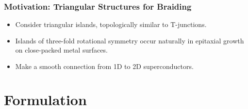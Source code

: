 \documentclass[xcolor=dvipsnames,10pt,aspectratio=169]{beamer}
\newcommand{\MO}{Motivation}
\newcommand{\FO}{Formulation}
\begin{document}
  \begin{frame}
    \frametitle{\MO: Triangular Structures for Braiding}
    \begin{multicols}{2}

    \begin{itemize}
      \item Consider triangular islands, topologically similar to T-junctions.
      \item Islands of three-fold rotational symmetry occur naturally in epitaxial growth on close-packed metal surfaces.
      \item Make a smooth connection from 1D to 2D superconductors.
    \end{itemize}
    \newline

    \begin{figure}
      \end{figure}
    \end{multicols}

  \end{frame}

  \section{\FO}
\end{document}
